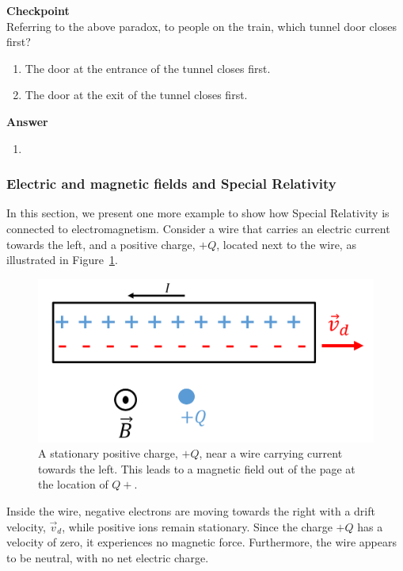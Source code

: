 \begin{framed}
\textbf{Checkpoint}\\
Referring to the above paradox, to people on the train, which tunnel door closes first?

\begin{enumerate}
\item The door at the entrance of the tunnel closes first.
\item The door at the exit of the tunnel closes first.
\end{enumerate}

\begin{framed}
\textbf{Answer}\\
\begin{enumerate}[resume]
\item
\end{enumerate}
\end{framed}
\end{framed}

\subsubsection{Electric and magnetic fields and Special Relativity}

In this section, we present one more example to show how Special Relativity is connected to electromagnetism. Consider a wire that carries an electric current towards the left, and a positive charge, $+Q$, located next to the wire, as illustrated in Figure~\ref{fig:specialrelativity:current}.

\begin{figure}[!htbp]
\centering
\includegraphics[width=0.5\linewidth]{files/current-08fd956639cd7f7deeb7878bc82f3d20.png}
\caption[]{A stationary positive charge, $+Q$, near a wire carrying current towards the left. This leads to a magnetic field out of the page at the location of $Q+$.}
\label{fig:specialrelativity:current}
\end{figure}

Inside the wire, negative electrons are moving towards the right with a drift velocity, $\vec v_d$, while positive ions remain stationary. Since the charge $+Q$ has a velocity of zero, it experiences no magnetic force. Furthermore, the wire appears to be neutral, with no net electric charge.

